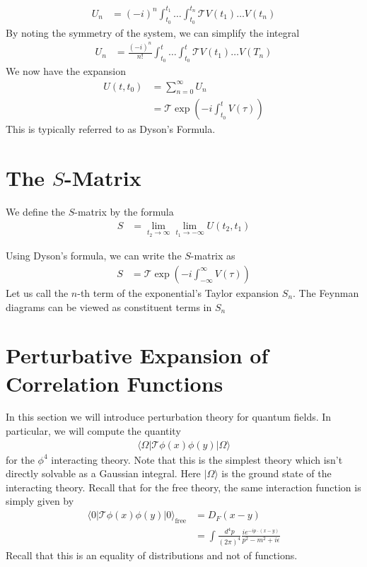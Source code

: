 \documentclass[book.tex]{subfiles}
\begin{document}
\begin{align}
    U_n &= (-i)^n \int_{t_0}^{t_1} \dotsc \int_{t_0}^{t_n} \mathcal{T} V(t_1)\dotsc V(t_n)
\end{align}
By noting the symmetry of the system, we can simplify the integral
\begin{align}
    U_n &= \frac{(-i)^n}{n!} \int_{t_0}^t \dotsc \int_{t_0}^t \mathcal{T} V(t_1)\dotsc V(T_n)
\end{align}
We now have the expansion
\begin{align}
    U(t, t_0) &= \sum_{n=0}^\infty U_n \\
    &= \mathcal{T} \exp \left ( -i \int_{t_0}^t V(\tau) \right )
\end{align}
This is typically referred to as Dyson's Formula.

\section{The $S$-Matrix}

We define the $S$-matrix by the formula
\begin{align}
    S &= \lim_{t_2 \to \infty} \lim_{t_1 \to -\infty} U(t_2, t_1)
\end{align}

Using Dyson's formula, we can write the $S$-matrix as
\begin{align}
    S &= \mathcal{T} \exp \left ( -i \int_{-\infty}^\infty V(\tau) \right )
\end{align}
Let us call the $n$-th term of the exponential's Taylor expansion $S_n$. The Feynman diagrams can be viewed as constituent terms in $S_n$

\section{Perturbative Expansion of Correlation Functions}
In this section we will introduce perturbation theory for quantum fields. In particular, we will compute the quantity
\begin{align}
    \langle \Omega | \mathcal{T}\phi(x)\phi(y) | \Omega \rangle
\end{align}
for the $\phi^4$ interacting theory. Note that this is the simplest theory which isn't directly solvable as a Gaussian integral. Here $|\Omega\rangle$ is the ground state of the interacting theory. Recall that for the free theory, the same interaction function is simply given by
\begin{align}
    \langle 0 | \mathcal{T} \phi(x) \phi(y) | 0 \rangle_{\textrm{free}} &= D_F(x-y) \\
    &= \int \frac{d^4p}{(2\pi)^4}\frac{ie^{-ip\cdot(x-y)}}{p^2-m^2+i\epsilon}
\end{align}
Recall that this is an equality of distributions and not of functions.
\end{document}
